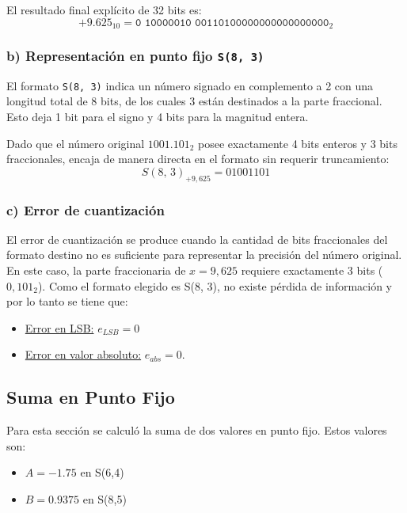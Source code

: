 \documentclass[12pt,a4paper]{article}
\begin{document}
El resultado final explícito de 32 bits es:
\begin{equation}
    +9.625_{10} = \texttt{0 10000010 00110100000000000000000}_{2}
    \label{eq_6}
\end{equation}


\subsubsection*{b) Representación en punto fijo \texttt{S(8, 3)}}
El formato \texttt{S(8, 3)} indica un número signado en complemento a 2 con una longitud total de 8 bits, de los cuales 3 están destinados a la parte fraccional. Esto deja 1 bit para el signo y 4 bits para la magnitud entera.

Dado que el número original $1001.101_{2}$ posee exactamente 4 bits enteros y 3 bits fraccionales, encaja de manera directa en el formato sin requerir truncamiento:
\begin{equation}
    S(8, \, 3)_{+9,625} = 01001101
\end{equation}


\subsubsection*{c) Error de cuantización}
El error de cuantización se produce cuando la cantidad de bits fraccionales del formato destino no es suficiente para representar la precisión del número original. En este caso, la parte fraccionaria de $x = 9,625$ requiere exactamente 3 bits ($0,101_{2}$). Como el formato elegido es S(8, 3), no existe pérdida de información y por lo tanto se tiene que:
\begin{itemize}
    \item \underline{Error en LSB:}                 $e_{LSB} = 0$
    \item \underline{Error en valor absoluto:}      $e_{abs} = 0$.
\end{itemize}



\subsection{Suma en Punto Fijo}                                     \label{sec_2.2}

Para esta sección se calculó la suma de dos valores en punto fijo. Estos valores son:

\begin{itemize}
    \item $A = -1.75$ en S(6,4)
    \item $B = 0.9375$ en S(8,5)
\end{itemize}
\end{document}
